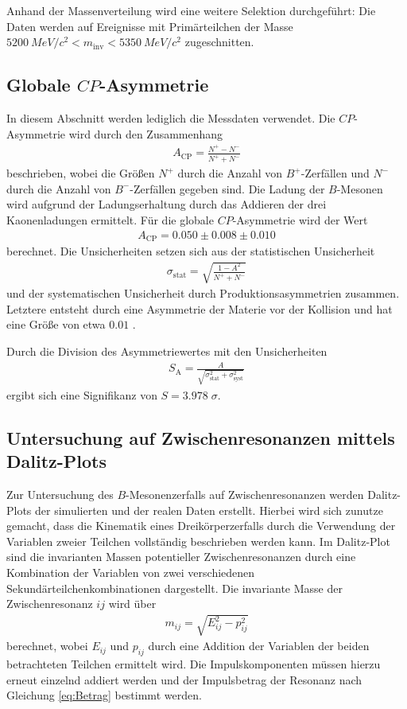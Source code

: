 Anhand der Massenverteilung wird eine weitere Selektion durchgeführt: Die Daten werden auf Ereignisse mit Primärteilchen der Masse $\SI{5200}{MeV/c^2} < m_\mathrm{inv} < \SI{5350}{MeV/c^2} $ zugeschnitten.

\subsection{Globale $CP$-Asymmetrie}
\label{globAsymm}
In diesem Abschnitt werden lediglich die Messdaten verwendet. 
Die $CP$-Asymmetrie wird durch den Zusammenhang 
\begin{align}
  A_\mathrm{CP}= \frac{N^{+} - N^{-}}{N^{+} + N^{-}}
  \label{eq:Asymm}
\end{align}
beschrieben, wobei die Größen $N^{+}$ durch die Anzahl von $B^{+}$-Zerfällen und $N^{-}$ durch die Anzahl von $B^{-}$-Zerfällen gegeben sind. 
Die Ladung der $B$-Mesonen wird aufgrund der Ladungserhaltung durch das Addieren der drei Kaonenladungen ermittelt. Für die globale $CP$-Asymmetrie wird der Wert 
\begin{align*}
  A_\mathrm{CP} = 0.050 \pm 0.008 \pm 0.010
\end{align*}
berechnet. Die Unsicherheiten setzen sich aus der statistischen Unsicherheit 
\begin{align}
  \sigma_\mathrm{stat} = \sqrt{\frac{1-A^2}{N^{+} + N^{-}}}
  \label{eq:sigma}
\end{align}
und der systematischen Unsicherheit durch Produktionsasymmetrien zusammen. Letztere entsteht durch eine Asymmetrie der Materie vor der Kollision und hat eine Größe von etwa  $0.01$ \cite{anleitung}.

Durch die Division des Asymmetriewertes mit den Unsicherheiten
\begin{align}
  S_\mathrm{A} = \frac{A}{\sqrt{\sigma_\mathrm{stat}^2 + \sigma_\mathrm{syst}^2}}
  \label{eq:Signifikanz}
\end{align}
ergibt sich eine Signifikanz von $S = 3.978\;\sigma$. 

\subsection{Untersuchung auf Zwischenresonanzen mittels Dalitz-Plots}
Zur Untersuchung des $B$-Mesonenzerfalls auf Zwischenresonanzen werden Dalitz-Plots der simulierten und der realen Daten erstellt. Hierbei wird sich zunutze gemacht, dass die Kinematik eines Dreikörperzerfalls durch die Verwendung der Variablen zweier Teilchen vollständig beschrieben werden kann. Im Dalitz-Plot sind die invarianten Massen potentieller Zwischenresonanzen durch eine Kombination der Variablen von zwei verschiedenen Sekundärteilchenkombinationen dargestellt. Die invariante Masse der Zwischenresonanz $ij$ wird über
\begin{align}
  m_{ij} = \sqrt{ E_{ij}^2 - p_{ij}^2}
\end{align}
berechnet, wobei $ E_{ij}$ und $ p_{ij}$ durch eine Addition der Variablen der beiden betrachteten Teilchen ermittelt wird. Die Impulskomponenten müssen hierzu erneut einzelnd addiert werden und der Impulsbetrag der Resonanz nach Gleichung \eqref{eq:Betrag} bestimmt werden. 

